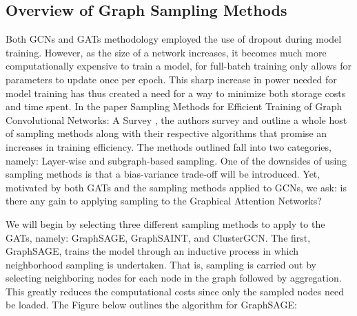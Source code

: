 \documentclass{article}
\begin{document}
	\subsection{Overview of Graph Sampling Methods} 
	
	Both GCNs and GATs methodology employed the use of dropout during model training. However, as the size of a network increases,
	it becomes much more computationally expensive to train a model, for full-batch training only allows for parameters to update once per epoch. This sharp increase in power needed for model training has thus created a need for a way to minimize both storage costs and time spent.
	In the paper Sampling Methods for Efficient Training of Graph Convolutional Networks: A Survey \cite{liu2021sampling}, the authors survey and outline a whole host 
	of sampling methods along with their respective algorithms that promise an increases in training efficiency. The methods outlined fall into two categories, namely: Layer-wise and subgraph-based sampling. One of the downsides of using sampling methods
	is that a bias-variance trade-off will be introduced. Yet, motivated by both GATs and the sampling methods applied to GCNs, we ask: is there any gain to applying sampling to the Graphical Attention Networks?
	
	We will begin by selecting three different sampling methods to apply to the GATs, namely: GraphSAGE, GraphSAINT, and ClusterGCN. The first, GraphSAGE, trains the model through an inductive process in which neighborhood sampling is undertaken. That is, sampling is carried out by 
	selecting neighboring nodes for each node in the graph followed by aggregation. This greatly reduces the computational costs since only the sampled nodes need be loaded. The Figure below outlines the algorithm for GraphSAGE:
	
\end{document}
